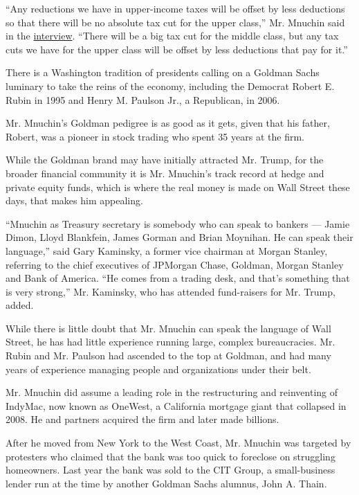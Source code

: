 ``Any reductions we have in upper-income taxes will be offset by less
deductions so that there will be no absolute tax cut for the upper
class,'' Mr. Mnuchin said in the
\href{http://www.cnbc.com/2016/11/30/exclusive-trumps-treasury-pick-says-i-want-to-slash-taxes-across-the-board.html}{interview}.
``There will be a big tax cut for the middle class, but any tax cuts we
have for the upper class will be offset by less deductions that pay for
it.''

There is a Washington tradition of presidents calling on a Goldman Sachs
luminary to take the reins of the economy, including the Democrat Robert
E. Rubin in 1995 and Henry M. Paulson Jr., a Republican, in 2006.

Mr. Mnuchin's Goldman pedigree is as good as it gets, given that his
father, Robert, was a pioneer in stock trading who spent 35 years at the
firm.

While the Goldman brand may have initially attracted Mr. Trump, for the
broader financial community it is Mr. Mnuchin's track record at hedge
and private equity funds, which is where the real money is made on Wall
Street these days, that makes him appealing.

``Mnuchin as Treasury secretary is somebody who can speak to bankers ---
Jamie Dimon, Lloyd Blankfein, James Gorman and Brian Moynihan. He can
speak their language,'' said Gary Kaminsky, a former vice chairman at
Morgan Stanley, referring to the chief executives of JPMorgan Chase,
Goldman, Morgan Stanley and Bank of America. ``He comes from a trading
desk, and that's something that is very strong,'' Mr. Kaminsky, who has
attended fund-raisers for Mr. Trump, added.

While there is little doubt that Mr. Mnuchin can speak the language of
Wall Street, he has had little experience running large, complex
bureaucracies. Mr. Rubin and Mr. Paulson had ascended to the top at
Goldman, and had many years of experience managing people and
organizations under their belt.

Mr. Mnuchin did assume a leading role in the restructuring and
reinventing of IndyMac, now known as OneWest, a California mortgage
giant that collapsed in 2008. He and partners acquired the firm and
later made billions.

After he moved from New York to the West Coast, Mr. Mnuchin was targeted
by protesters who claimed that the bank was too quick to foreclose on
struggling homeowners. Last year the bank was sold to the CIT Group, a
small-business lender run at the time by another Goldman Sachs alumnus,
John A. Thain.

